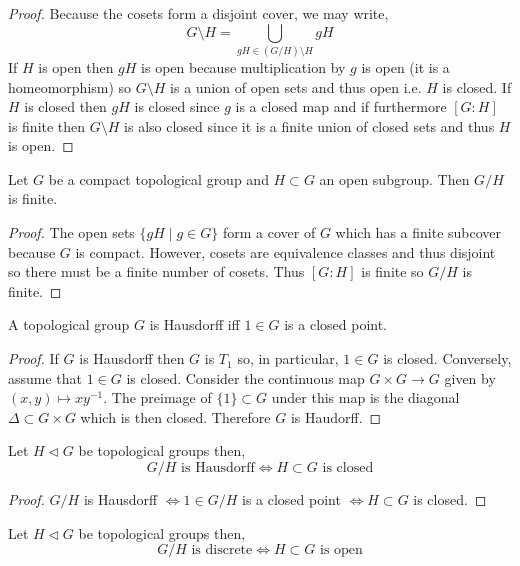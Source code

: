 \documentclass[12pt]{extarticle}
\begin{document}
\begin{proof}
Because the cosets form a disjoint cover, we may write,
\[ G \setminus H = \bigcup_{g H \in (G / H) \setminus H} g H \]
If $H$ is open then $g H$ is open because multiplication by $g$ is open (it is a homeomorphism) so $G \setminus H$ is a union of open sets and thus open i.e. $H$ is closed. If $H$ is closed then $g H$ is closed since $g$ is a closed map and if furthermore $[G : H]$ is finite then $G \setminus H$ is also closed since it is a finite union of closed sets and thus $H$ is open. 
\end{proof}

\begin{proposition}
Let $G$ be a compact topological group and $H \subset G$ an open subgroup. Then $G / H$ is finite.
\end{proposition}

\begin{proof}
The open sets $\{ g H \mid g \in G \}$ form a cover of $G$ which has a finite subcover because $G$ is compact. However, cosets are equivalence classes and thus disjoint so there must be a finite number of cosets. Thus $[G : H]$ is finite so $G / H$ is finite.  
\end{proof}

\begin{proposition}
A topological group $G$ is Hausdorff iff $1 \in G$ is a closed point.
\end{proposition}

\begin{proof}
If $G$ is Hausdorff then $G$ is $T_1$ so, in particular, $1 \in G$ is closed. Conversely, assume that $1 \in G$ is closed. Consider the continuous map $G \times G \to G$ given by $(x, y) \mapsto x y^{-1}$. The preimage of $\{ 1 \} \subset G$ under this map is the diagonal $\Delta \subset G \times G$ which is then closed. Therefore $G$ is Haudorff. 
\end{proof}

\begin{proposition}
Let $H \triangleleft G$ be topological groups then,
\[ G / H \text{ is Hausdorff} \iff H \subset G \text{ is closed} \] 
\end{proposition}

\begin{proof}
$G / H$ is Hausdorff $\iff 1 \in G / H$ is a closed point $\iff H \subset G$ is closed. 
\end{proof}

\begin{proposition}
Let $H \triangleleft G$ be topological groups then,
\[ G / H \text{ is discrete} \iff H \subset G \text{ is open} \] 
\end{proposition}
\end{document}

